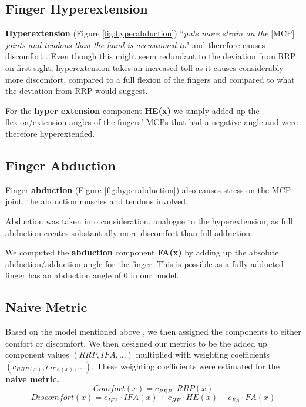 \documentclass[headsepline,footsepline,footinclude=false,oneside,fontsize=11pt,paper=a4,listof=totoc,bibliography=totoc]{scrbook} %
\begin{document}
\subsection{Finger Hyperextension}

\textbf{Hyperextension} (Figure \ref{fig:hyperabduction}) ``\textit{puts more strain on the }[MCP] \textit{joints and tendons than the hand is accustomed to}" and therefore causes discomfort \cite{laviola1999survey}.
Even though this might seem redundant to the deviation from RRP on first sight, hyperextension takes an increased toll as it causes considerably more discomfort, compared to a full flexion of the fingers and compared to what the deviation from RRP would suggest.

For the \textbf{hyper extension} component \textbf{HE(x)} we simply added up the flexion/extension angles of the fingers' MCPs that had a negative angle and were therefore hyperextended.

\subsection{Finger Abduction}

Finger \textbf{abduction} (Figure \ref{fig:hyperabduction})
also causes stress on the MCP joint, the abduction muscles and tendons involved.

Abduction was taken into consideration, analogue to the hyperextension, as full abduction creates substantially more discomfort than full adduction.

We computed the \textbf{abduction} component \textbf{FA(x)} by adding up the absolute abduction/adduction angle for the finger. This is possible as a fully adducted finger has an abduction angle of 0 in our model.


\subsection{Naive Metric}


Based on the model mentioned above \cite{vink2012editorial}, we then assigned the components to either comfort or discomfort. We then designed our metrics to be the added up component values \begin{math}(RRP, IFA, ...)\end{math} multiplied with weighting coefficients \begin{math}(c_{RRP(x)}, c_{IFA(x)}, ...)\end{math}. These weighting coefficients were estimated for the \textbf{naive metric.} 
	\[
	Comfort(x) = c_{RRP}\cdot RRP(x)
	\]
	\[
	Discomfort(x) = c_{IFA}\cdot IFA(x)  +  c_{HE}\cdot HE(x)  +  c_{FA}\cdot FA(x)
	\]
\end{document}
